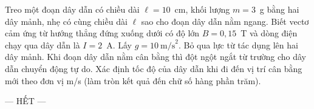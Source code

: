 	\begin{ex}%
		Treo một đoạn dây dẫn có chiều dài $\ell=10$~cm, khối lượng $m=3$~g bằng hai dây mảnh, nhẹ có cùng chiều dài $\ell$ sao cho đoạn dây dẫn nằm ngang. Biết vectơ cảm ứng từ hướng thẳng đứng xuống dưới có độ lớn $B=0{,}15$~T và dòng điện chạy qua dây dẫn là $I=2$~A. Lấy $g=10~\text{m/s}^2$. Bỏ qua lực từ tác dụng lên hai dây mảnh. Khi đoạn dây dẫn nằm cân bằng thì đột ngột ngắt từ trường cho dây dẫn chuyển động tự do. Xác định tốc độ của dây dẫn khi đi đến vị trí cân bằng mới theo đơn vị m/s (làm tròn kết quả đến chữ số hàng phần trăm).
		\par
	\end{ex}

	\centerline{--- HẾT ---}


